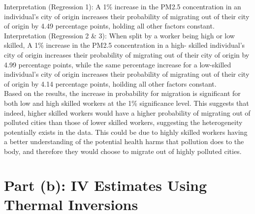 \documentclass[11pt]{article}
\begin{document}
\noindent Interpretation (Regression 1): A 1\% increase in the PM2.5 concentration in an individual's city of origin increases their probability of migrating out of their city of origin by 4.49 percentage points, holding all other factors constant.\\

\noindent Interpretation (Regression 2 \& 3): When split by a worker being high or low skilled, A 1\% increase in the PM2.5 concentration in a high- skilled individual's city of origin increases their probability of migrating out of their city of origin by 4.99 percentage points, while the same percentage increase for a low-skilled individual's city of origin increases their probability of migrating out of their city of origin by 4.14 percentage points, hoilding all other factors constant.\\

\noindent Based on the results, the increase in probability for migration is significant for both low and high skilled workers at the 1\% significance level. This suggests that indeed, higher skilled workers would have a higher probability of migrating out of polluted cities than those of lower skilled workers, suggesting the heterogeneity potentially exists in the data. This could be due to highly skilled workers having a better understanding of the potential health harms that pollution does to the body, and therefore they would choose to migrate out of highly polluted cities.


\section*{Part (b): IV Estimates Using Thermal Inversions}
\end{document}
